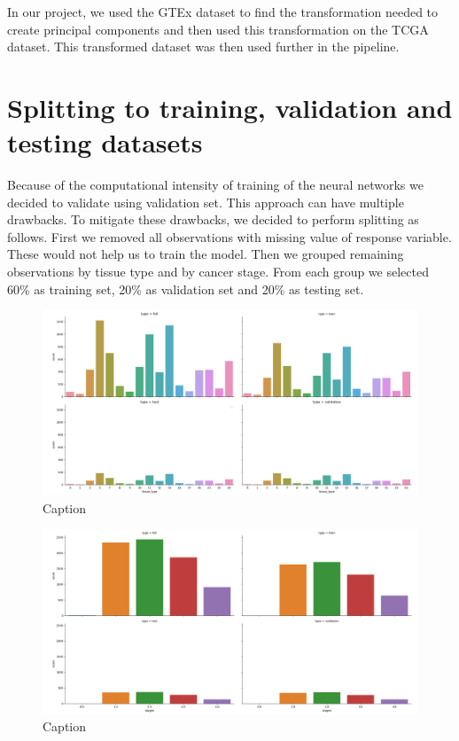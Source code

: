 In our project, we used the GTEx dataset to find the transformation needed to create principal components and then used this transformation on the TCGA dataset.
This transformed dataset was then used further in the pipeline.

\newpage
%
\section{Splitting to training, validation and testing datasets}
Because of the computational intensity of training of the neural networks we decided to validate using validation set. 
This approach can have multiple drawbacks.
To mitigate these drawbacks, we decided to perform splitting as follows.
First we removed all observations with missing value of response variable.
These would not help us to train the model.
Then we grouped remaining observations by tissue type and by cancer stage.
From each group we selected 60\% as training set, 20\% as validation set and 20\% as testing set.

\begin{figure}
    \centering
    \includegraphics[width=\linewidth]{images/split_tissue.png}
    \caption{Caption}
    \label{fig:split_tissue}
\end{figure}

\begin{figure}
    \centering
    \includegraphics[width=\linewidth]{images/split_stages.png}   
    \caption{Caption}
    \label{fig:split_stages}
\end{figure}

